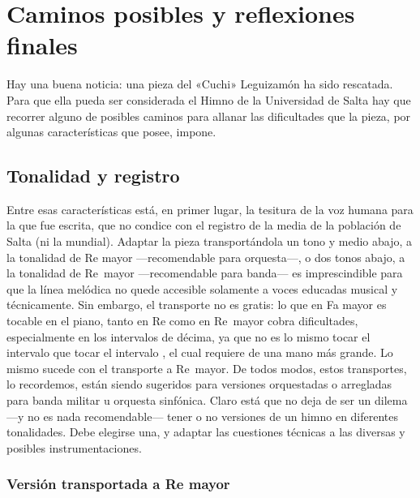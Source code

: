 \chapter{Caminos posibles y reflexiones finales}
\label{cap:caminos-reflexiones}

Hay una buena noticia: una pieza del «Cuchi» Leguizamón ha sido rescatada. Para que ella pueda ser considerada el Himno de la Universidad de Salta hay que recorrer alguno de posibles caminos para allanar las dificultades que la pieza, por algunas características que posee, impone.

\section{Tonalidad y registro}
\label{sec:tonalidad-registro}

Entre esas características está, en primer lugar, la tesitura de la voz humana para la que fue escrita, que no condice con el registro de la media de la población de Salta (ni la mundial). Adaptar la pieza transportándola un tono y medio abajo, a la tonalidad de Re mayor ---recomendable para orquesta---, o dos tonos abajo, a la tonalidad de Re\bemoltxt\ mayor ---recomendable para banda--- es imprescindible para que la línea melódica no quede accesible solamente a voces educadas musical y técnicamente. Sin embargo, el transporte no es gratis: lo que en Fa mayor es tocable en el piano, tanto en Re como en Re\bemoltxt\ mayor cobra dificultades, especialmente en los intervalos de décima, ya que no es lo mismo tocar el intervalo  que tocar el intervalo \hbox{,} el cual requiere de una mano más grande. Lo mismo sucede con el transporte a Re\bemoltxt\ mayor. De todos modos, estos transportes, lo recordemos, están siendo sugeridos para versiones orquestadas o arregladas para banda militar u orquesta sinfónica. Claro está que no deja de ser un dilema ---y no es nada recomendable--- tener o no versiones de un himno en diferentes tonalidades. Debe elegirse una, y adaptar las cuestiones técnicas a las diversas y posibles instrumentaciones.

\subsection{Versión transportada a Re mayor}
\label{subsec:transporte-re}


